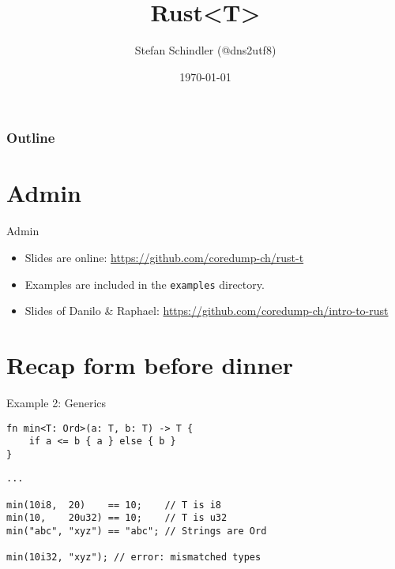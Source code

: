 \documentclass[aspectratio=1610,t]{beamer}
\title{Rust<T>}
\date{\today}
\author{Stefan Schindler (@dns2utf8)}
\institute{Coredump Rapperswil}
\begin{document}
{
\maketitle
}

\begin{frame}[noframenumbering]
	\frametitle{Outline}
	\tableofcontents
\end{frame}



{
\section{Admin}
}

\begin{frame}[fragile]{Admin}

\begin{itemize}[<+- | alert@+>]
  \item Slides are online:
        \url{https://github.com/coredump-ch/rust-t}
  \item Examples are included in the \texttt{examples} directory.
  \item Slides of Danilo \& Raphael:
        \url{https://github.com/coredump-ch/intro-to-rust}
\end{itemize}

\end{frame}

{
\section{Recap form before dinner}
}

\begin{frame}[fragile]{Example 2: Generics}

\begin{verbatim}
fn min<T: Ord>(a: T, b: T) -> T {
    if a <= b { a } else { b }
}
\end{verbatim}
\pause
\begin{verbatim}
...

min(10i8,  20)    == 10;    // T is i8
min(10,    20u32) == 10;    // T is u32
min("abc", "xyz") == "abc"; // Strings are Ord

min(10i32, "xyz"); // error: mismatched types
\end{verbatim}

\end{frame}
\end{document}
